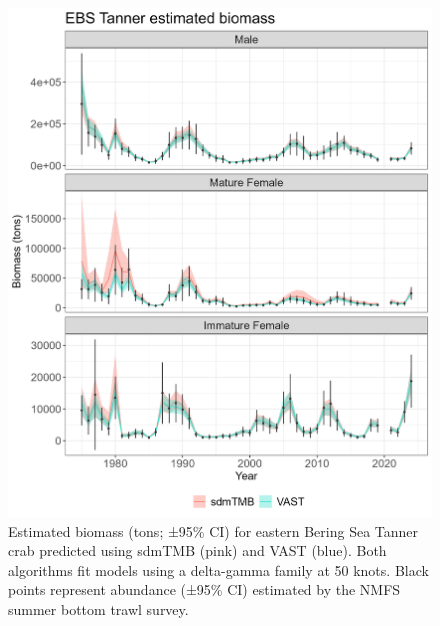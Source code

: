 \documentclass[
]{article}
\begin{document}
\begin{figure}

{\centering \includegraphics[width=1\linewidth,height=1\textheight]{../BAIRDI/Figures/TannerEBS.biomass.sdmTMBVASTindex} 

}

\caption{Estimated biomass (tons; ±95\% CI) for eastern Bering Sea Tanner crab predicted using sdmTMB (pink) and VAST (blue). Both algorithms fit models using a delta-gamma family at 50 knots. Black points represent abundance (±95\% CI) estimated by the NMFS summer bottom trawl survey.}\label{fig:EBSbairdi-bio-compare}
\end{figure}
\end{document}
